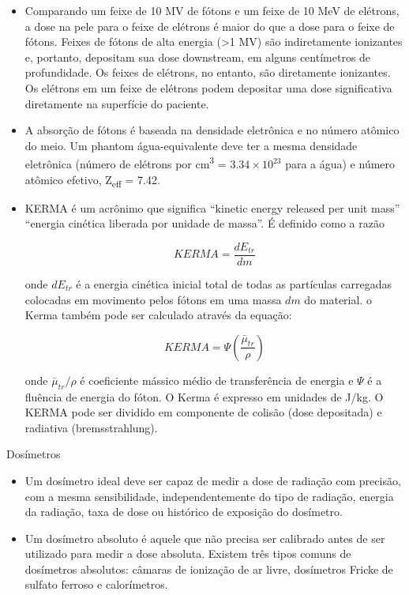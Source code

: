 \documentclass[11pt,a4paper]{article}
\newcounter{exemplo}
\begin{document}
\begin{exemplo}
\begin{itemize}
        \item Comparando um feixe de 10 MV de fótons e um feixe de 10 MeV de elétrons, a dose na pele para o feixe de elétrons é maior do que a dose para o feixe de fótons. Feixes de fótons de alta energia (>1 MV) são indiretamente ionizantes e, portanto, depositam sua dose downstream, em alguns centímetros de profundidade. Os feixes de elétrons, no entanto, são diretamente ionizantes. Os elétrons em um feixe de elétrons podem depositar uma dose significativa diretamente na superfície do paciente.
        
        \item A absorção de fótons é baseada na densidade eletrônica e no número atômico do meio. Um phantom água-equivalente deve ter a mesma densidade eletrônica (número de elétrons por \unit{cm^3} =  $3.34 \times 10^{23}$ para a água) e número atômico efetivo, Z\textsubscript{eff} = 7.42.
        
        \item KERMA é um acrônimo que significa “kinetic energy released per unit mass” “energia cinética liberada por unidade de massa”. É definido como a razão
        
            $$KERMA = \frac{dE_{tr}}{dm}$$

        onde $dE_{tr}$ é a energia cinética inicial total de todas as partículas carregadas colocadas em movimento pelos fótons em uma massa $dm$ do material. o Kerma também pode ser calculado através da equação:

            $$KERMA = \Psi \left(\frac{\bar{\mu}_{tr}}{\rho}\right)$$

        onde $\bar{\mu}_{tr}/\rho$ é coeficiente mássico médio de transferência de energia e $\Psi$ é a fluência de energia do fóton. O Kerma é expresso em unidades de J/kg. O KERMA pode ser dividido em componente de colisão (dose depositada) e radiativa (bremsstrahlung).
    \end{itemize}

    \textcolor{CarnationPink}{Dosímetros}
    \begin{itemize}
        \item Um dosímetro ideal deve ser capaz de medir a dose de radiação com precisão, com a mesma sensibilidade, independentemente do tipo de radiação, energia da radiação, taxa de dose ou histórico de exposição do dosímetro.
        
        \item Um dosímetro absoluto é aquele que não precisa ser calibrado antes de ser utilizado para medir a dose absoluta. Existem três tipos comuns de dosímetros absolutos: câmaras de ionização de ar livre, dosímetros Fricke de sulfato ferroso  e calorímetros.
        

\end{itemize}
\end{exemplo}
\end{document}
